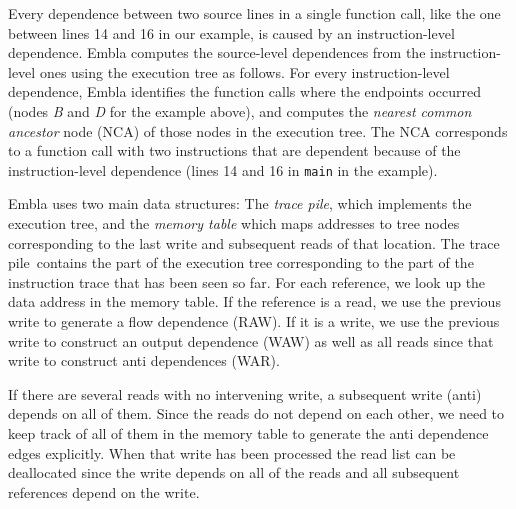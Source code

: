\documentclass[times, 10pt,twocolumn]{article}
\begin{document}
Every dependence between two source lines in a single function call,
like the one between lines 14 and 16 in our example, is caused by an
instruction-level dependence. Embla computes the source-level dependences
from the instruction-level ones using the execution tree as follows. For
every instruction-level dependence, Embla identifies the function calls
where the endpoints occurred (nodes {\it B} and {\it D} for the example
above), and computes the {\em nearest common ancestor} node (NCA) of
those nodes in the execution tree. The NCA corresponds to a function
call with two instructions that are dependent because of
the instruction-level dependence (lines 14 and 16 in {\tt main} in the
example).

\newcommand{\tracepile}{trace pile}


Embla uses two main data structures: The {\em \tracepile}, which implements 
the execution tree, and the {\em memory table} which maps addresses to tree
nodes corresponding to the last write and subsequent reads of that
location. The \tracepile\ contains the part of the execution tree
corresponding to the part of the instruction trace that has been
seen so far.
For each reference, we look up the data address in the memory 
table. If the reference is a read, we use the previous write to generate
a flow dependence (RAW). If it is a write, we use the previous write to 
construct an output dependence (WAW) as well as all reads since that 
write to construct anti dependences (WAR).

If there are several reads with no intervening write, a subsequent write
(anti) depends on all of them. Since the reads do not depend on each other,
we need to keep track of all of them in the memory table to generate the
anti dependence edges explicitly. When that write has been processed 
the read list can be deallocated since
the write depends on all of the reads and
all subsequent references depend on the write.
\end{document}
